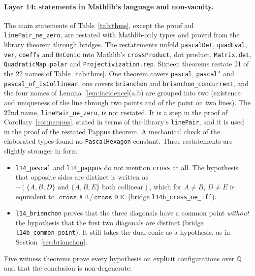 \documentclass[11pt]{article}
\theoremstyle{remark}
\newcommand{\lean}[1]{\texttt{#1}}
\begin{document}
\paragraph{Layer 14: statements in Mathlib's language and non-vacuity.} The main statements of
Table~\ref{tab:thms}, except the proof aid \lean{linePair\_ne\_zero}, are restated with Mathlib-only types and proved from the library theorem through
bridges. The restatements unfold \lean{pascalDet}, \lean{quadEval}, \lean{ver}, \lean{coeffs} and
\lean{OnConic} into Mathlib's \lean{crossProduct}, dot product, \lean{Matrix.det},
\lean{QuadraticMap.polar} and \lean{Projectivization.rep}. Sixteen theorems restate 21 of the 22
names of Table~\ref{tab:thms}. One theorem covers \lean{pascal}, \lean{pascal'} and
\lean{pascal\_of\_isCollinear}, one covers \lean{brianchon} and \lean{brianchon\_concurrent}, and the
four names of Lemma~\ref{lem:incidence}(a,b) are grouped into two (existence and uniqueness of the
line through two points and of the point on two lines). The 22nd name,
\lean{linePair\_ne\_zero}, is not restated. It is a step in the proof of Corollary~\ref{cor:pappus},
stated in terms of the library's \lean{linePair}, and it is used in the proof of the restated Pappus
theorem. A mechanical check of the elaborated types found no \lean{PascalHexagon} constant. Three
restatements are slightly stronger in form:
\begin{itemize}
\item \lean{l14\_pascal} and \lean{l14\_pappus} do not mention \lean{cross} at all.
The hypothesis that opposite sides are distinct is written as
$\neg(\{A,B,D\}\text{ and }\{A,B,E\}\text{ both collinear})$, which for $A\ne B$, $D\ne E$ is
equivalent to $\lean{cross A B}\ne\lean{cross D E}$ (bridge \lean{l14b\_cross\_ne\_iff}).
\item \lean{l14\_brianchon} proves that the three diagonals have a common point
\emph{without} the hypothesis that the first two diagonals are distinct
(bridge \lean{l14b\_common\_point}). It still takes the dual conic as a hypothesis, as
in Section~\ref{sec:brianchon}.
\end{itemize}
Five witness theorems prove every hypothesis on explicit configurations over $\mathbb{Q}$ and that
the conclusion is non-degenerate:
\end{document}
